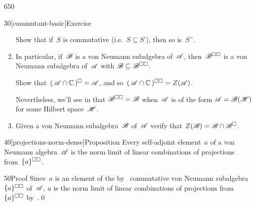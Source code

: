 \begin{parsec}{650}
\begin{point}{30}[commutant-basic]{Exercise}
\begin{enumerate}
Show that if~$S$ is commutative (i.e.~$S\subseteq S^\square$), 
then so is~$S^{\square\square}$.
\item
In particular,
if~$\mathscr{B}$ is a von Neumann subalgebra of~$\mathscr{A}$,
then~$\mathscr{B}^{\square\square}$
is a von Neumann subalgebra of~$\mathscr{A}$
with $\mathscr{B}\subseteq \mathscr{B}^{\square\square}$.

Show that~$(\,\mathscr{A}\cap \mathbb{C}\,)^\square=\mathscr{A}$,
and so~$(\,\mathscr{A}\cap\mathbb{C}\,)^{\square\square} = Z(\mathscr{A})$.

Nevertheless,
we'll see in  that $\mathscr{B}^{\square\square}=\mathscr{B}$
when~$\mathscr{A}$ is of the form $\mathscr{A}=\mathscr{B}(\mathscr{H})$
for some Hilbert space~$\mathscr{H}$.
\item
Given a von Neumann subalgebra~$\mathscr{B}$
of~$\mathscr{A}$
verify that $Z(\mathscr{B})=\mathscr{B}\cap \mathscr{B}^{\square}$.
\end{enumerate}
\end{point}
\begin{point}{40}[projections-norm-dense]{Proposition}%
Every self-adjoint element~$a$ of a von Neumann algebra~$\mathscr{A}$
is the norm limit
of linear combinations
of projections from~$\smash{\{a\}}^{\square\square}$.
\begin{point}{50}{Proof}%
Since~$a$ is an element
of the by~
commutative von Neumann subalgebra~$\smash{\{a\}}^{\square\square}$
of~$\mathscr{A}$,
$a$ is the norm limit of linear combinations
of projections from~$\smash{\{a\}}^{\square\square}$
by~.\qed
\end{point}
\end{point}
\end{parsec}
